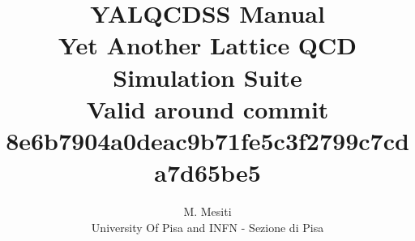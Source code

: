 \documentclass[a4paper,10pt]{book}
\title{{\Huge \bf YALQCDSS Manual} \\
Yet Another Lattice QCD Simulation Suite \\
{\small Valid around commit 
8e6b7904a0deac9b71fe5c3f2799c7cda7d65be5}}
\author{M. Mesiti\\{\small University Of Pisa and INFN - Sezione di Pisa}}
\begin{document}
\maketitle
\date{}
 

  

  
  
%  
\end{document}
